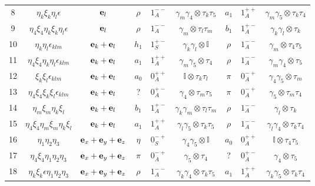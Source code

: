 \begin{table}
\begin{center}
\begin{tabular}{c|c|c|ccc|ccc}
8  & $\eta _k\xi _k \eta _l \epsilon$            & ${\bf e}_l$                     & $\rho$   & $1^{--}_A$ & $\gamma _m\gamma _4\otimes \tau _k \tau _5$  & $a_1$    & $1^{++}_A$ & $\gamma _m\gamma _5\otimes \tau _k\tau _4$ \\
9  & $\eta_4\xi_4\eta_k\xi_k\eta_l\epsilon$      & ${\bf e}_l$                     & $\rho$   & $1^{--}_A$ & $\gamma _m \otimes \tau _l\tau _m$           & $b_1$    & $1^{+-}_A$ & $\gamma _k\gamma _l \otimes \tau _k$ \\
10 & $\eta _k\eta _l \epsilon _{klm}$            & ${\bf e}_k+{\bf e}_l$           & $h_1$    & $1^{+-}_S$ & $\gamma _k\gamma _l\otimes \mathbb{I}$       & $\rho$   & $1^{--}_A$ & $\gamma _m\otimes \tau _4\tau _5$ \\
11 & $\eta_4\xi_4\eta _k\eta _l \epsilon _{klm}$ & ${\bf e}_k+{\bf e}_l$           & $a_1$    & $1^{++}_A$ & $\gamma _m\gamma _5\otimes \tau _4$          & $\rho$   & $1^{--}_A$ & $\gamma _m\gamma _4\otimes \tau _5$ \\
12 & $\xi _k\xi _l \epsilon _{klm}$              & ${\bf e}_k+{\bf e}_l$           & $a_0$    & $0^{++}_A$ & $\mathbb{I}\otimes \tau _k\tau _l$           & $\pi$    & $0^{-+}_A$ & $\gamma _4\gamma _5\otimes \tau _m$ \\
13 & $\eta_4\xi_4\xi _k\xi _l \epsilon _{klm}$   & ${\bf e}_k+{\bf e}_l$           & ?        & $0^{+-}_A$ & $\gamma _4\otimes \tau _m\tau _5$            & $\pi$    & $0^{-+}_A$ & $\gamma _5\otimes \tau _m\tau _4$ \\
14 & $\eta _m\xi _m\eta _k\xi _l$                & ${\bf e}_k+{\bf e}_l$           & $b_1$    & $1^{+-}_A$ & $\gamma _k\gamma _m\otimes \tau _l \tau _m$  & $\rho$   & $1^{--}_A$ & $\gamma _l\otimes \tau _k$ \\
15 & $\eta_4\xi_4\eta _m\xi _m\eta _k\xi _l$     & ${\bf e}_k+{\bf e}_l$           & $a_1$    & $1^{++}_A$ & $\gamma _l\gamma _5\otimes \tau _k \tau _5$  & $\rho$   & $1^{--}_A$ & $\gamma _l\gamma _4\otimes \tau _k\tau _4$ \\
16 & $\eta _1\eta _2\eta _3$                     & ${\bf e}_x+{\bf e}_y+{\bf e}_z$ & $\eta$   & $0^{-+}_S$ & $\gamma _4\gamma _5\otimes \mathbb{I}$       & $a_0$    & $0^{++}_A$ & $\mathbb{I}\otimes \tau _4\tau _5$ \\
17 & $\eta_4\xi_4\eta _1\eta _2\eta _3$          & ${\bf e}_x+{\bf e}_y+{\bf e}_z$ & $\pi$    & $0^{-+}_A$ & $\gamma _5\otimes \tau _4$                   & ?        & $0^{+-}_A$ & $\gamma _4\otimes \tau _5$ \\
18 & $\eta_k\xi_k\epsilon\eta _1\eta _2\eta _3$  & ${\bf e}_x+{\bf e}_y+{\bf e}_z$ & $\rho$   & $1^{--}_A$ & $\gamma _k\gamma _4\otimes \tau _k\tau _5$   & $a_1$    & $1^{++}_A$ & $\gamma _k\gamma _5\otimes \tau _k\tau _4$ \\

\end{tabular}
\end{center}
\end{table}
